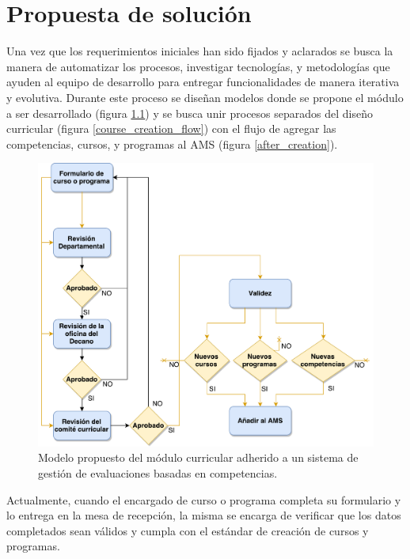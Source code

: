 \chapter{Propuesta de solución} %
\label{capitulo4} %
Una vez que los requerimientos iniciales han sido fijados y aclarados se busca la manera de automatizar los procesos, investigar tecnologías, y metodologías que ayuden al equipo de desarrollo para entregar funcionalidades de manera iterativa y evolutiva. Durante este proceso se diseñan modelos donde se propone el módulo a ser desarrollado (figura \ref{curriculum_model}) y se busca unir procesos separados del diseño curricular (figura \ref{course_creation_flow}) con el flujo de agregar las competencias, cursos, y programas al AMS (figura \ref{after_creation}).

\begin{figure}[H]
\centering
\includegraphics[scale=0.5]{Capitulos/PropuestadeSolucion/Imagenes/curriculum_model}
\caption{Modelo propuesto del módulo curricular adherido a un sistema de gestión de evaluaciones basadas en competencias.}
  \label{curriculum_model}
\end{figure}

Actualmente, cuando el encargado de curso o programa completa su formulario y lo entrega en la mesa de recepción, la misma se encarga de verificar que los datos completados sean válidos y cumpla con el estándar de creación de cursos y programas. 

